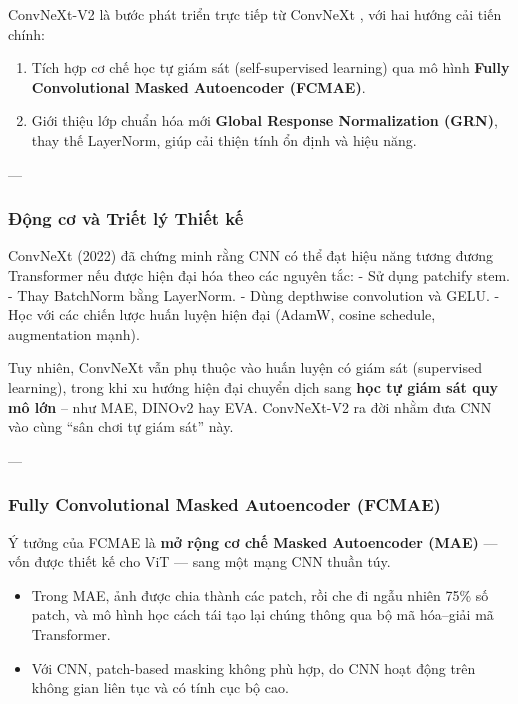 ConvNeXt-V2 là bước phát triển trực tiếp từ ConvNeXt \cite{Liu2022}, với hai hướng cải tiến chính:
\begin{enumerate}
	\item Tích hợp cơ chế học tự giám sát (self-supervised learning) qua mô hình \textbf{Fully Convolutional Masked Autoencoder (FCMAE)}.
	\item Giới thiệu lớp chuẩn hóa mới \textbf{Global Response Normalization (GRN)}, thay thế LayerNorm, giúp cải thiện tính ổn định và hiệu năng.
\end{enumerate}

---

\subsubsection{Động cơ và Triết lý Thiết kế}
\label{subsubsec:convnext_v2_motivation}

ConvNeXt (2022) đã chứng minh rằng CNN có thể đạt hiệu năng tương đương Transformer nếu được hiện đại hóa theo các nguyên tắc:
- Sử dụng patchify stem.
- Thay BatchNorm bằng LayerNorm.
- Dùng depthwise convolution và GELU.
- Học với các chiến lược huấn luyện hiện đại (AdamW, cosine schedule, augmentation mạnh).

Tuy nhiên, ConvNeXt vẫn phụ thuộc vào huấn luyện có giám sát (supervised learning), trong khi xu hướng hiện đại chuyển dịch sang \textbf{học tự giám sát quy mô lớn} – như MAE, DINOv2 hay EVA. ConvNeXt-V2 ra đời nhằm đưa CNN vào cùng “sân chơi tự giám sát” này.

---

\subsubsection{Fully Convolutional Masked Autoencoder (FCMAE)}
\label{subsubsec:fcmae}

Ý tưởng của FCMAE là \textbf{mở rộng cơ chế Masked Autoencoder (MAE)} — vốn được thiết kế cho ViT — sang một mạng CNN thuần túy.

\begin{itemize}
	\item Trong MAE, ảnh được chia thành các patch, rồi che đi ngẫu nhiên 75\% số patch, và mô hình học cách tái tạo lại chúng thông qua bộ mã hóa–giải mã Transformer.
	\item Với CNN, patch-based masking không phù hợp, do CNN hoạt động trên không gian liên tục và có tính cục bộ cao.
\end{itemize}

